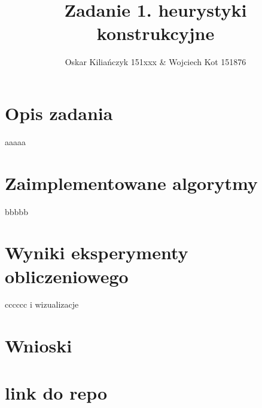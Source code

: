 \documentclass[11pt]{article}
\title{Zadanie 1. heurystyki konstrukcyjne }
\author{Oskar Kiliańczyk 151xxx \& Wojciech Kot 151876}
\date{}
\begin{document}
\maketitle
\newpage

\chapter{Opis zadania}\label{ch:opis-zadania}

aaaaa

\chapter{Zaimplementowane algorytmy}\label{ch:zaimplementowane-algorytmy}

    bbbbb


\chapter{Wyniki eksperymenty obliczeniowego}\label{ch:wyniki-eksperymenty-obliczeniowego}


cccccc
i wizualizacje


\chapter{Wnioski}\label{ch:wnioski}

\chapter{link do repo}\label{ch:link-do-repo}
\end{document}
